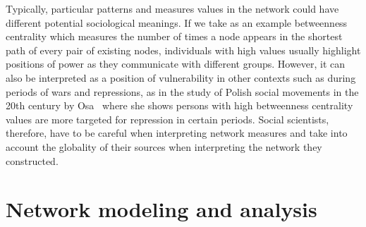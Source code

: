 Typically, particular patterns and measures values in the network could have different potential sociological meanings.
If we take as an example betweenness centrality which measures the number of times a node appears in the shortest path of every pair of existing nodes, individuals with high values usually highlight positions of power as they communicate with different groups.
However, it can also be interpreted as a position of vulnerability in other contexts such as during periods of wars and repressions, as in the study of Polish social movements in the 20th century by Osa~\cite{osaSolidarityContentionNetworks2003} where she shows persons with high betweenness centrality values are more targeted for repression in certain periods.
Social scientists, therefore, have to be careful when interpreting network measures and take into account the globality of their sources when interpreting the network they constructed.


\section{Network modeling and analysis}\label{sec:modeling}



